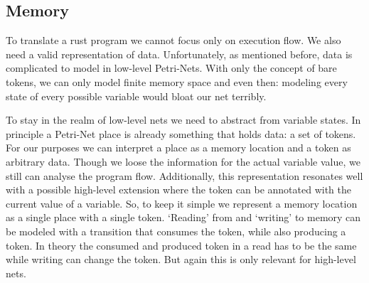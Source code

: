 \subsection{Memory}
To translate a rust program we cannot focus only on execution flow.
We also need a valid representation of data.
Unfortunately, as mentioned before, data is complicated to model in low-level Petri-Nets.
With only the concept of bare tokens, we can only model finite memory space and even then: modeling every state of every possible variable would bloat our net terribly.

To stay in the realm of low-level nets we need to abstract from variable states.
In principle a Petri-Net place is already something that holds data: a set of tokens.
For our purposes we can interpret a place as a memory location and a token as arbitrary data.
Though we loose the information for the actual variable value, we still can analyse the program flow.
Additionally, this representation resonates well with a possible high-level extension where the token can be annotated with the current value of a variable.
So, to keep it simple we represent a memory location as a single place with a single token.
`Reading' from and `writing' to memory can be modeled with a transition that consumes the token, while also producing a token.
In theory the consumed and produced token in a read has to be the same while writing can change the token.
But again this is only relevant for high-level nets.

